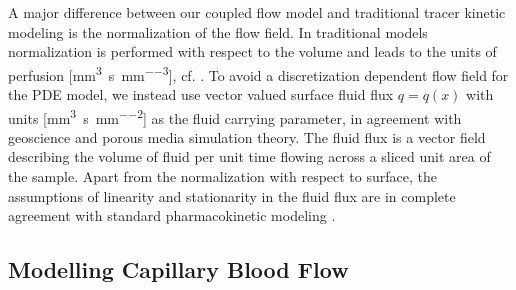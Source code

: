 \documentclass[journal,twocolumn]{IEEEtran}
\newcommand{\siQmm}{\milli\meter\cubed\per\second\per\milli\meter\cubed}
\newcommand{\siq}{\milli\meter\cubed\per\second\per\milli\meter\squared}
\begin{document}
	A major difference between our coupled flow model and traditional tracer kinetic modeling is the normalization of the flow field.
In traditional models normalization is performed with respect to the volume and leads to the units of perfusion [\si{\siQmm}], cf. \cite{sourbron13}.
	To avoid a discretization dependent flow field for the PDE model, we instead use vector valued surface fluid flux $q = q(x)$ with units [\si{\siq}] as the fluid carrying parameter, in agreement with geoscience and porous media simulation theory.
	The fluid flux is a vector field describing the volume of fluid per unit time flowing across a sliced unit area of the sample.	
	Apart from the normalization with respect to surface, the assumptions of linearity and stationarity in the fluid flux are in complete agreement with standard pharmacokinetic modeling \cite{sourbron13}.
	

	
	\subsection{Modelling Capillary Blood Flow}\label{sec:flow}
	
\end{document}
